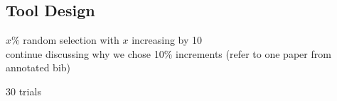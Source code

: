 \documentclass[conference]{IEEEtran}
\begin{document}
\subsection{Tool Design}

$x\%$ random selection with $x$ increasing by 10 \\

continue discussing why we chose 10\% increments (refer to one paper from annotated bib)

30 trials

\end{document}
